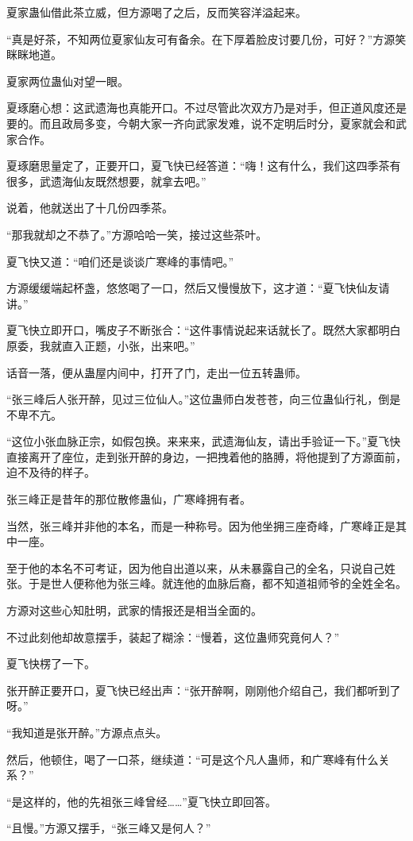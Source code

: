 \begin{this_body}
夏家蛊仙借此茶立威，但方源喝了之后，反而笑容洋溢起来。

“真是好茶，不知两位夏家仙友可有备余。在下厚着脸皮讨要几份，可好？”方源笑眯眯地道。

夏家两位蛊仙对望一眼。

夏琢磨心想：这武遗海也真能开口。不过尽管此次双方乃是对手，但正道风度还是要的。而且政局多变，今朝大家一齐向武家发难，说不定明后时分，夏家就会和武家合作。

夏琢磨思量定了，正要开口，夏飞快已经答道：“嗨！这有什么，我们这四季茶有很多，武遗海仙友既然想要，就拿去吧。”

说着，他就送出了十几份四季茶。

“那我就却之不恭了。”方源哈哈一笑，接过这些茶叶。

夏飞快又道：“咱们还是谈谈广寒峰的事情吧。”

方源缓缓端起杯盏，悠悠喝了一口，然后又慢慢放下，这才道：“夏飞快仙友请讲。”

夏飞快立即开口，嘴皮子不断张合：“这件事情说起来话就长了。既然大家都明白原委，我就直入正题，小张，出来吧。”

话音一落，便从蛊屋内间中，打开了门，走出一位五转蛊师。

“张三峰后人张开醉，见过三位仙人。”这位蛊师白发苍苍，向三位蛊仙行礼，倒是不卑不亢。

“这位小张血脉正宗，如假包换。来来来，武遗海仙友，请出手验证一下。”夏飞快直接离开了座位，走到张开醉的身边，一把拽着他的胳膊，将他提到了方源面前，迫不及待的样子。

张三峰正是昔年的那位散修蛊仙，广寒峰拥有者。

当然，张三峰并非他的本名，而是一种称号。因为他坐拥三座奇峰，广寒峰正是其中一座。

至于他的本名不可考证，因为他自出道以来，从未暴露自己的全名，只说自己姓张。于是世人便称他为张三峰。就连他的血脉后裔，都不知道祖师爷的全姓全名。

方源对这些心知肚明，武家的情报还是相当全面的。

不过此刻他却故意摆手，装起了糊涂：“慢着，这位蛊师究竟何人？”

夏飞快楞了一下。

张开醉正要开口，夏飞快已经出声：“张开醉啊，刚刚他介绍自己，我们都听到了呀。”

“我知道是张开醉。”方源点点头。

然后，他顿住，喝了一口茶，继续道：“可是这个凡人蛊师，和广寒峰有什么关系？”

“是这样的，他的先祖张三峰曾经……”夏飞快立即回答。

“且慢。”方源又摆手，“张三峰又是何人？”


\end{this_body}
